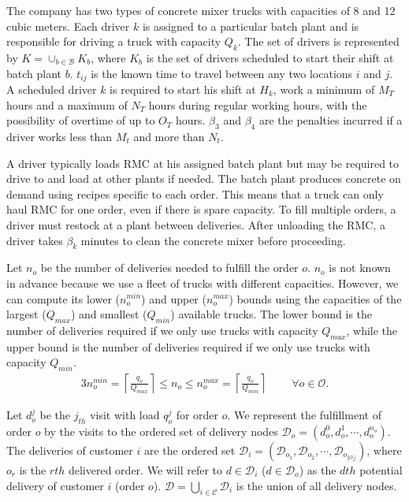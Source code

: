 \documentclass{article}
\begin{document}
The company has two types of concrete mixer trucks with capacities of 8 and 12 cubic meters. Each driver $k$ is assigned to a particular batch plant and is responsible for driving a truck with capacity $Q_k$. The set of drivers is represented by $K =\cup_{b \in \mathcal{B}}K_b $, where $K_b$ is the set of drivers scheduled to start their shift at batch plant $b$. $t_{ij}$ is the known time to travel between any two locations $i$ and $j$.
A scheduled driver $k$ is required to start his shift at $H_k$, work a minimum of $M_T$ hours and a maximum of $N_T$ hours during regular working hours, with the possibility of overtime of up to $O_T$ hours. $\beta_3$ and $\beta_4$ are the penalties incurred if a driver works less than $M_t$ and more than $N_t$.

A driver typically loads RMC at his assigned batch plant but may be required to drive to and load at other plants if needed. The batch plant produces concrete on demand using recipes specific to each order. This means that a truck can only haul RMC for one order, even if there is spare capacity. To fill multiple orders, a driver must restock at a plant between deliveries. After unloading the RMC, a driver takes $\beta_k$ minutes to clean the concrete mixer before proceeding. %

Let $n_o$ be the number of deliveries needed to fulfill the order $o$. $n_o$ is not known in advance because we use a fleet of trucks with different capacities. However, we can compute its lower ($n_o^{min}$) and upper ($n_o^{max}$) bounds using the capacities of the largest ($Q_{max}$) and smallest ($Q_{min}$) available trucks. The lower bound is the number of deliveries required if we only use trucks with capacity $Q_{max}$, while the upper bound is the number of deliveries required if we only use trucks with capacity $Q_{min}$. 
\begin{alignat}{3}
    \label{mod:c0}
       n_o^{min} = \left\lceil \frac{q_o}{Q_{max}} \right\rceil \leq n_o \leq n_o^{max} = \left\lceil \frac{q_o}{Q_{min}} \right\rceil  & \text{ } & 
 \forall  o \in \mathcal{O}.
\end{alignat}

Let $d^j_{o}$ be the $j_{th}$ visit with load $q^j_{o}$ for order $o$. We represent the fulfillment of order $o$ by the visits to the ordered set of delivery nodes $\mathcal{D}_o= \left(d^0_{o},d^1_{o},\cdots, d^{n_o}_{o}\right)$. The deliveries of customer $i$ are the ordered set $\mathcal{D}_i= (\mathcal{D}_{o_1}, \mathcal{D}_{o_2},\cdots,\mathcal{D}_{o_{|O_i|}})$, where $o_r$ is the $rth$ delivered order. We will refer to $d \in \mathcal{D}_i$ ($d \in \mathcal{D}_o$) as the $dth$ potential delivery of customer $i$ (order $o$). $\mathcal{D}=\bigcup_{i\in \mathcal{C}} \mathcal{D}_i$ is the union of all delivery nodes.
\end{document}
